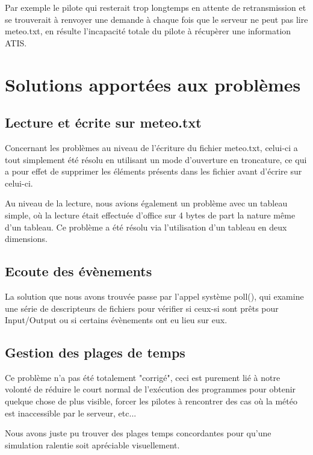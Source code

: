 \documentclass{report}
\begin{document}
{			Par exemple le pilote qui resterait trop longtemps en attente de retransmission et se trouverait à renvoyer une demande à chaque fois que le serveur ne peut pas lire meteo.txt, en résulte l'incapacité totale du pilote à récupèrer une information ATIS.

	\section{Solutions apportées aux problèmes}

		\subsection{Lecture et écrite sur meteo.txt}

			Concernant les problèmes au niveau de l'écriture du fichier meteo.txt, celui-ci a tout simplement été résolu en utilisant un mode d'ouverture en troncature, ce qui a pour effet de supprimer les éléments présents dans les fichier avant d'écrire sur celui-ci.

			Au niveau de la lecture, nous avions également un problème avec un tableau simple, où la lecture était effectuée d'office sur 4 bytes de part la nature même d'un tableau. Ce problème a été résolu via l'utilisation d'un tableau en deux dimensions.

		\subsection{Ecoute des évènements}

			La solution que nous avons trouvée passe par l'appel système poll(), qui examine une série de descripteurs de fichiers pour vérifier si ceux-si sont prêts pour Input/Output ou si certains évènements ont eu lieu sur eux. \cite{sysCalls} \cite{pollArticle}

		\subsection{Gestion des plages de temps}

			Ce problème n'a pas été totalement "corrigé", ceci est purement lié à notre volonté de réduire le court normal de l'exécution des programmes pour obtenir quelque chose de plus visible, forcer les pilotes à rencontrer des cas où la météo est inaccessible par le serveur, etc...

			Nous avons juste pu trouver des plages temps concordantes pour qu'une simulation ralentie soit apréciable visuellement.

}
\end{document}
